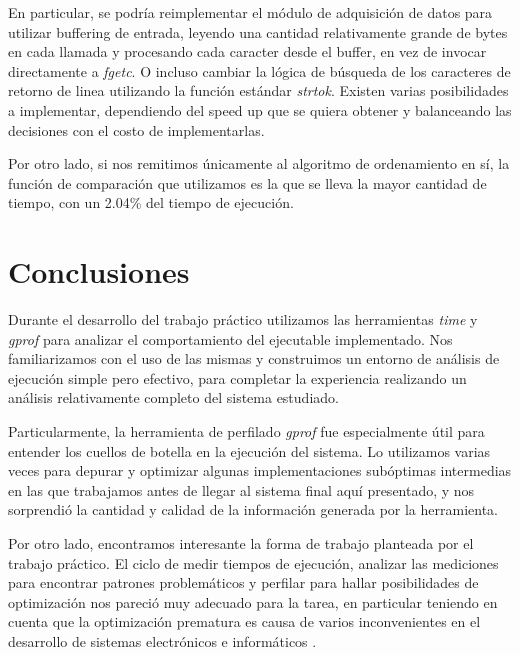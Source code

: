 \documentclass[a4paper,11pt]{article}
\begin{document}
En particular, se podría reimplementar el módulo de adquisición de datos para
utilizar buffering de entrada, leyendo una cantidad relativamente grande de
bytes en cada llamada y procesando cada caracter desde el buffer, en vez de
invocar directamente a \textit{fgetc}. O incluso cambiar la lógica de búsqueda
de los caracteres de retorno de linea utilizando la función estándar
\textit{strtok}. Existen varias posibilidades a implementar, dependiendo del
speed up que se quiera obtener y balanceando las decisiones con el costo de
implementarlas.

Por otro lado, si nos remitimos únicamente al algoritmo de ordenamiento en sí,
la función de comparación que utilizamos es la que se lleva la mayor cantidad
de tiempo, con un 2.04\% del tiempo de ejecución.

\section{Conclusiones}

Durante el desarrollo del trabajo práctico utilizamos las herramientas
\textit{time} y \textit{gprof} para analizar el comportamiento del ejecutable
implementado. Nos familiarizamos con el uso de las mismas y construimos un
entorno de análisis de ejecución simple pero efectivo, para completar la
experiencia realizando un análisis relativamente completo del sistema
estudiado.

Particularmente, la herramienta de perfilado \textit{gprof} fue especialmente
útil para entender los cuellos de botella en la ejecución del sistema. Lo
utilizamos varias veces para depurar y optimizar algunas implementaciones
subóptimas intermedias en las que trabajamos antes de llegar al sistema final
aquí presentado, y nos sorprendió la cantidad y calidad de la información
generada por la herramienta.

Por otro lado, encontramos interesante la forma de trabajo planteada por el
trabajo práctico. El ciclo de medir tiempos de ejecución, analizar las
mediciones para encontrar patrones problemáticos y perfilar para hallar
posibilidades de optimización nos pareció muy adecuado para la tarea, en
particular teniendo en cuenta que la optimización prematura es causa de varios
inconvenientes en el desarrollo de sistemas electrónicos e informáticos
\cite{OPT}.
\end{document}
